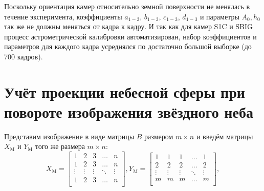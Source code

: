 \documentclass[12pt,a4paper]{article}
\begin{document}
Поскольку ориентация камер относительно земной поверхности не менялась в течение эксперимента, коэффициенты $a_{1-3}$, $b_{1-3}$, $c_{1-3}$, $d_{1-3}$ и параметры $A_0, h_0$ так же не должны меняться от кадра к кадру. И так как для камер S1C и SBIG процесс астрометрической калибровки автоматизирован, набор коэффициентов и параметров для каждого кадра усреднялся по достаточно большой выборке (до 700 кадров).

\section{Учёт проекции небесной сферы при повороте изображения звёздного неба} \label{app:postprocessing}
Представим изображение в виде матрицы $B$ размером $m \times n$ и введём матрицы $X_{\text{M}}$ и $Y_{\text{M}}$ того же размера $m \times n$:
\begin{equation}\label{eq:eq16}
X_{\text{M}}=
\begin{bmatrix}
1 & 2 & 3 & \dots  & n \\
1 & 2 & 3 & \dots  & n \\
\vdots & \vdots & \vdots & \ddots & \vdots \\
1 & 2 & 3 & \dots  & n \\
\end{bmatrix}, 
Y_{\text{M}}=
\begin{bmatrix}
1 & 1 & 1 & \dots  & 1 \\
2 & 2 & 2 & \dots  & 2 \\
\vdots & \vdots & \vdots & \ddots & \vdots \\
m & m & m & \dots  & m \\
\end{bmatrix},
\end{equation}
\end{document}
